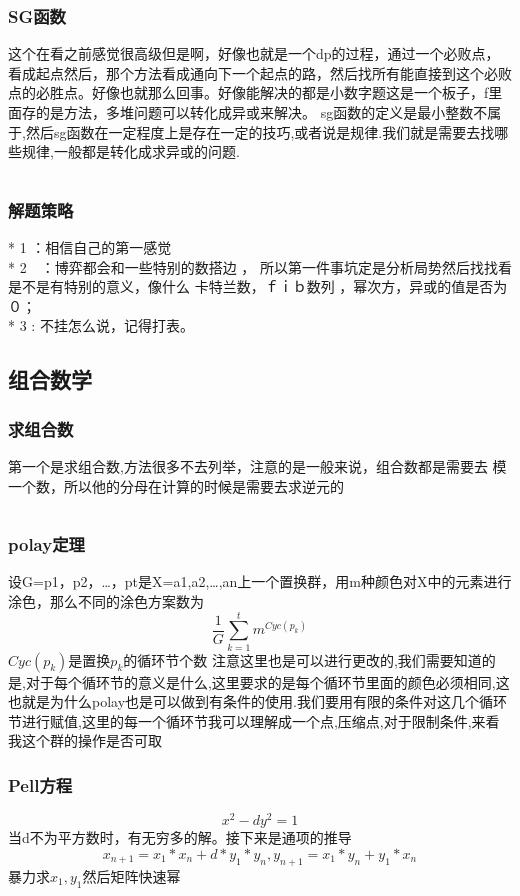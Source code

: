\documentclass[a4paper,11pt]{article}
\begin{document}
\begin{CJK}{UTF8}{gbsn}
\subsubsection{SG函数}
这个在看之前感觉很高级但是啊，好像也就是一个dp的过程，通过一个必败点，看成起点然后，那个方法看成通向下一个起点的路，然后找所有能直接到这个必败点的必胜点。好像也就那么回事。好像能解决的都是小数字题这是一个板子，f里面存的是方法，多堆问题可以转化成异或来解决。
sg函数的定义是最小整数不属于,然后sg函数在一定程度上是存在一定的技巧,或者说是规律.我们就是需要去找哪些规律,一般都是转化成求异或的问题.
\inputminted{c++}{../scoure/math/boyi.cpp}
\subsubsection{解题策略}
* 1  ：相信自己的第一感觉\\
* 2　：博弈都会和一些特别的数搭边 ， 所以第一件事坑定是分析局势然后找找看是不是有特别的意义，像什么 卡特兰数，ｆｉｂ数列 ，幂次方，异或的值是否为０；\\
* 3  : 不挂怎么说，记得打表。\\
\subsection{组合数学}
\subsubsection{求组合数}
第一个是求组合数,方法很多不去列举，注意的是一般来说，组合数都是需要去
模一个数，所以他的分母在计算的时候是需要去求逆元的
\inputminted{c++}{../scoure/math/zuhe.cpp}
\subsubsection{polay定理}
设G={p1，p2，…，pt}是X={a1,a2,…,an}上一个置换群，用m种颜色对X中的元素进行涂色，那么不同的涂色方案数为
$$\frac{1}{G}\sum_{k=1}^t m^{Cyc(p_k)}$$
$Cyc(p_k)$是置换$p_k$的循环节个数
注意这里也是可以进行更改的,我们需要知道的是,对于每个循环节的意义是什么,这里要求的是每个循环节里面的颜色必须相同,这也就是为什么polay也是可以做到有条件的使用.我们要用有限的条件对这几个循环节进行赋值,这里的每一个循环节我可以理解成一个点,压缩点,对于限制条件,来看我这个群的操作是否可取
\subsubsection{Pell方程}
$$x^2-dy^2=1$$
当d不为平方数时，有无穷多的解。接下来是通项的推导
$$ x_{n+1} = x_1*x_n+d*y_1*y_n,y_{n+1} = x_1*y_n + y_1*x_n $$
暴力求$x_1,y_1$然后矩阵快速幂

\end{CJK}
\end{document}
